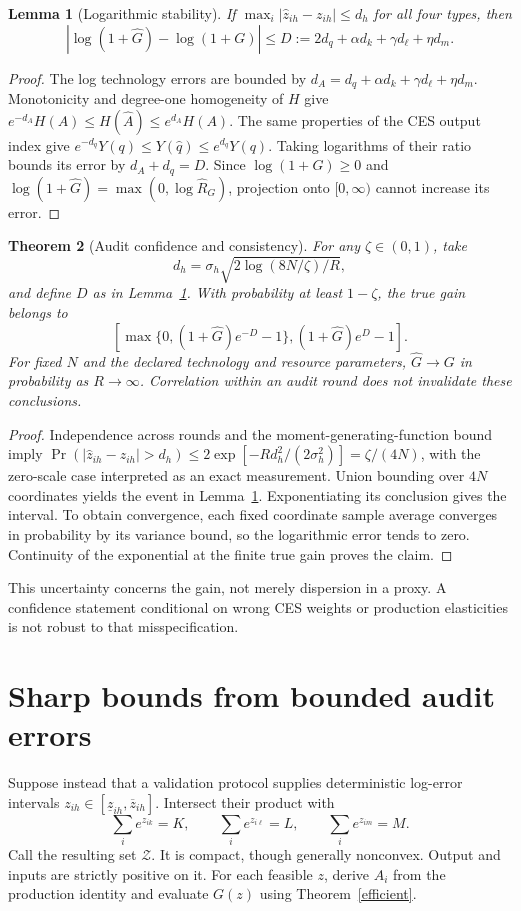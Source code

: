 \documentclass[11pt]{article}
\newtheorem{theorem}{Theorem}
\newtheorem{lemma}[theorem]{Lemma}
\theoremstyle{remark}\newtheorem{remark}[theorem]{Remark}
\begin{document}
\begin{lemma}[Logarithmic stability]\label{stable}
If $\max_i|\widehat z_{ih}-z_{ih}|\leq d_h$ for all four types, then
\[
 |\log(1+\widehat G)-\log(1+G)|
 \leq D:=2d_q+\alpha d_k+\gamma d_\ell+\eta d_m.
\]
\end{lemma}
\begin{proof}
The log technology errors are bounded by
$d_A=d_q+\alpha d_k+\gamma d_\ell+\eta d_m$.
Monotonicity and degree-one homogeneity of $H$ give
$e^{-d_A}H(A)\leq H(\widehat A)\leq e^{d_A}H(A)$.
The same properties of the CES output index give
$e^{-d_q}Y(q)\leq Y(\widehat q)\leq e^{d_q}Y(q)$.
Taking logarithms of their ratio bounds its error by $d_A+d_q=D$. Since $\log(1+G)\geq0$ and $\log(1+\widehat G)=\max(0,\log\widehat R_G)$, projection onto $[0,\infty)$ cannot increase its error.
\end{proof}

\begin{theorem}[Audit confidence and consistency]\label{audit}
For any $\zeta\in(0,1)$, take
\[d_h=\sigma_h\sqrt{2\log(8N/\zeta)/R},\]
and define $D$ as in Lemma~\ref{stable}. With probability at least $1-\zeta$, the true gain belongs to
\[
 \left[\max\{0,(1+\widehat G)e^{-D}-1\},                     (1+\widehat G)e^D-1\right].
\]
For fixed $N$ and the declared technology and resource parameters, $\widehat G\to G$ in probability as $R\to\infty$. Correlation within an audit round does not invalidate these conclusions.
\end{theorem}
\begin{proof}
Independence across rounds and the moment-generating-function bound imply
$\Pr(|\widehat z_{ih}-z_{ih}|>d_h)\leq2\exp[-Rd_h^2/(2\sigma_h^2)]=\zeta/(4N)$, with the zero-scale case interpreted as an exact measurement. Union bounding over $4N$ coordinates yields the event in Lemma~\ref{stable}. Exponentiating its conclusion gives the interval. To obtain convergence, each fixed coordinate sample average converges in probability by its variance bound, so the logarithmic error tends to zero. Continuity of the exponential at the finite true gain proves the claim.
\end{proof}

This uncertainty concerns the gain, not merely dispersion in a proxy. A confidence statement conditional on wrong CES weights or production elasticities is not robust to that misspecification.

\section{Sharp bounds from bounded audit errors}
Suppose instead that a validation protocol supplies deterministic log-error intervals $z_{ih}\in[\underline z_{ih},\overline z_{ih}]$. Intersect their product with
\[
 \sum_i e^{z_{ik}}=K,\qquad
 \sum_i e^{z_{i\ell}}=L,\qquad
 \sum_i e^{z_{im}}=M.
\]
Call the resulting set $\mathcal Z$. It is compact, though generally nonconvex. Output and inputs are strictly positive on it. For each feasible $z$, derive $A_i$ from the production identity and evaluate $G(z)$ using Theorem~\ref{efficient}.
\end{document}
